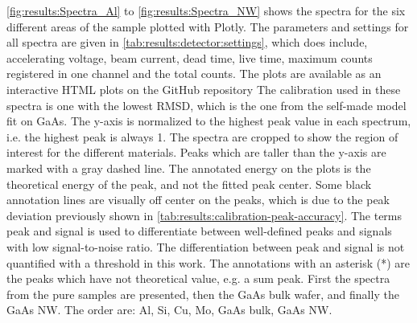 \cref{fig:results:Spectra_Al} to \cref{fig:results:Spectra_NW} shows the spectra for the six different areas of the sample plotted with Plotly.
The parameters and settings for all spectra are given in \cref{tab:results:detector:settings}, which does include, accelerating voltage, beam current, dead time, live time, maximum counts registered in one channel and the total counts.
The plots are available as an interactive HTML plots on the GitHub repository
The calibration used in these spectra is one with the lowest RMSD, which is the one from the self-made model fit on GaAs.
The y-axis is normalized to the highest peak value in each spectrum, i.e. the highest peak is always 1.
The spectra are cropped to show the region of interest for the different materials.
Peaks which are taller than the y-axis are marked with a gray dashed line.
The annotated energy on the plots is the theoretical energy of the peak, and not the fitted peak center.
Some black annotation lines are visually off center on the peaks, which is due to the peak deviation previously shown in \cref{tab:results:calibration-peak-accuracy}.
The terms peak and signal is used to differentiate between well-defined peaks and signals with low signal-to-noise ratio.
The differentiation between peak and signal is not quantified with a threshold in this work. %
The annotations with an asterisk (*) are the peaks which have not theoretical value, e.g. a sum peak.
First the spectra from the pure samples are presented, then the GaAs bulk wafer, and finally the GaAs NW.
The order are: Al, Si, Cu, Mo, GaAs bulk, GaAs NW.




